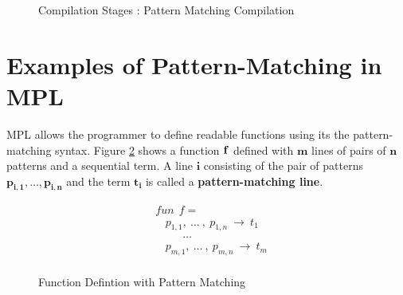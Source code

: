 \documentclass[11pt]{article}
\begin{document}
\begin{figure}[h!]
\begin {center}
\caption{Compilation Stages : Pattern Matching Compilation} \label{fig:Pmatch:Overview}
\end{center}
\end{figure}

\section {Examples of Pattern-Matching in MPL}
MPL allows the programmer to define readable functions using its the pattern-matching syntax. Figure  \ref {fig:Pmatch_fDefn} shows a function ${\bf f}$ defined with ${\mathbf {m}}$ lines of pairs of ${\mathbf {n}}$ patterns and a sequential term. A line ${\mathbf {i}}$ consisting of the pair of patterns ${\mathbf{p_{i,1},\ldots,p_{i,n}}}$ and the term $\mathbf{t_i}$ is called a {\bf pattern-matching line}. 

\begin{figure}[h!]
\begin{align*} 
&fun~~f = \\
&~~~~ p_{1,1},~\ldots~, ~ p_{1,n} ~\to ~t_1 \\
&~~~~~~~~~~~ \ldots \\
&~~~~ p_{m,1},~\ldots~, ~ p_{m,n} ~\to ~t_m \\
\end{align*} 
\caption{Function Defintion with Pattern Matching} \label{fig:Pmatch_fDefn}
\end{figure}
\end{document}
